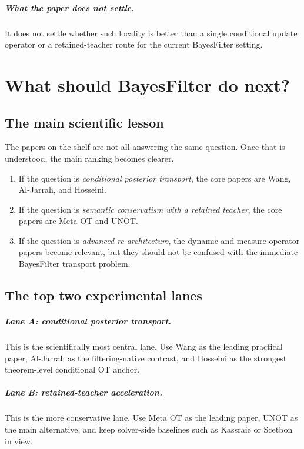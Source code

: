 \documentclass[11pt]{report}
\begin{document}
\paragraph{What the paper does not settle.}
It does not settle whether such locality is better than a single conditional update
operator or a retained-teacher route for the current BayesFilter setting.

\chapter{What should BayesFilter do next?}

\section{The main scientific lesson}

The papers on the shelf are not all answering the same question.  Once that is
understood, the main ranking becomes clearer.

\begin{enumerate}[label=(\arabic*)]
  \item If the question is \emph{conditional posterior transport}, the core papers
  are Wang, Al-Jarrah, and Hosseini.
  \item If the question is \emph{semantic conservatism with a retained teacher},
  the core papers are Meta OT and UNOT.
  \item If the question is \emph{advanced re-architecture}, the dynamic and
  measure-operator papers become relevant, but they should not be confused with the
  immediate BayesFilter transport problem.
\end{enumerate}

\section{The top two experimental lanes}

\paragraph{Lane A: conditional posterior transport.}
This is the scientifically most central lane.  Use Wang as the leading practical
paper, Al-Jarrah as the filtering-native contrast, and Hosseini as the strongest
theorem-level conditional OT anchor.

\paragraph{Lane B: retained-teacher acceleration.}
This is the more conservative lane.  Use Meta OT as the leading paper, UNOT as the
main alternative, and keep solver-side baselines such as Kassraie or Scetbon in
view.
\end{document}
